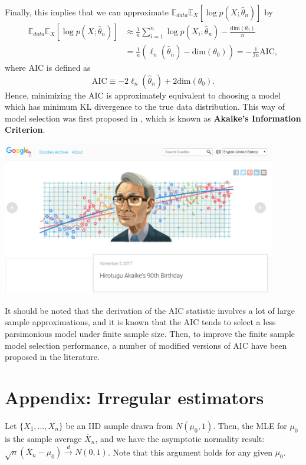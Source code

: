 \documentclass[10.5pt, A4paper, openany, uplatex]{book}
\newcommand{\E}{\mathbb{E}}
\renewcommand{\hat}{\widehat}
\renewcommand{\bar}{\overline}
\numberwithin{equation}{section}
\begin{document}
Finally, this implies that we can approximate $\E_{data} \E_X[\log p(X; \hat \theta_n)]$ by
\begin{align*}
	\E_{data} \E_X[\log p(X; \hat \theta_n)] 
	& \approx \frac{1}{n}\sum_{i = 1}^n \log p(X_i; \hat \theta_n) - \frac{\text{dim}(\theta_0)}{n}\\
	& = \frac{1}{n} ( \ell_n(\hat \theta_n) - \text{dim}(\theta_0) ) = - \frac{1}{2n} \text{AIC}, 
\end{align*}
where $\text{AIC}$ is defined as
\[
	\text{AIC} \equiv - 2\ell_n(\hat \theta_n) + 2 \text{dim}(\theta_0).
\]
Hence, minimizing the AIC is approximately equivalent to choosing a model which has minimum KL divergence to the true data distribution.
This way of model selection was first proposed in \cite{akaike1973information}, which is known as \textbf{Akaike's Information Criterion}.
\begin{center}
	\includegraphics[width=12cm]{akaike.png}
\end{center}
It should be noted that the derivation of the AIC statistic involves a lot of large sample approximations, and it is known that the AIC tends to select a less parsimonious model under finite sample size.
Then, to improve the finite sample model selection performance, a number of modified versions of AIC have been proposed in the literature.

\section*{Appendix: Irregular estimators}

Let $\{X_1, \ldots, X_n\}$ be an IID sample drawn from $N(\mu_0, 1)$.
Then, the MLE for $\mu_0$ is the sample average $\bar X_n$, and we have the asymptotic normality result: $\sqrt{n}(\bar X_n - \mu_0) \overset{d}{\to} N(0, 1)$. 
Note that this argument holds for any given $\mu_0$.
\end{document}
